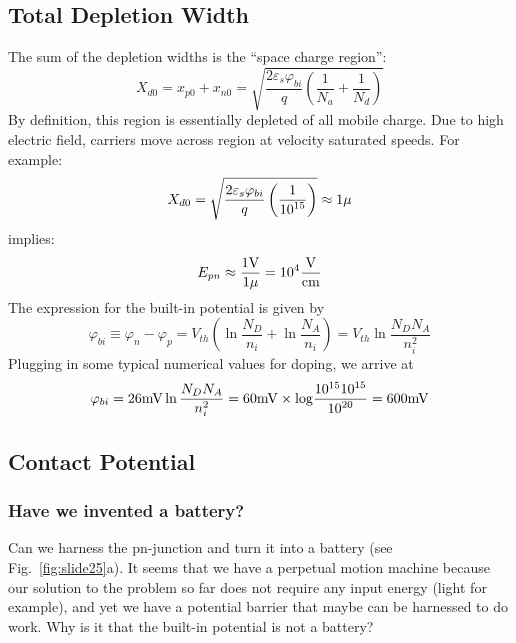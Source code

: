  

\subsection{Total Depletion Width}

The sum of the depletion widths is the “space charge region”:
%
\begin{equation} 
	{X_{d0}} = {x_{p0}} + {x_{n0}} = \sqrt {\frac{{2{\varepsilon _s}{\varphi _{bi}}}}{q}\left( {\frac{1}{{{N_a}}} + \frac{1}{{{N_d}}}} \right)} 
\end{equation}
% 
By definition, this region is essentially depleted of all mobile charge.   Due to high electric field, carriers move across region at velocity saturated speeds.  For example:
\begin{equation} 
	{X_{d0}} = \sqrt {\frac{{2{\varepsilon _s}{\varphi _{bi}}}}{q}\left( {\frac{1}{{{{10}^{15}}}}} \right)}  \approx 1{\rm{\mu }} 
\end{equation}
%
implies:
%
\begin{equation} 
	{E_{pn}} \approx \frac{{1{\rm{V}}}}{{1{\rm{\mu }}}} = {10^4}\frac{{\rm{V}}}{{{\rm{cm}}}} 
\end{equation}
%
The expression for the built-in potential is given by
%
\begin{equation} 
	{\varphi _{bi}} \equiv {\varphi _n} - {\varphi _p} = {V_{th}}\left( {\ln \frac{{{N_D}}}{{{n_i}}} + \ln \frac{{{N_A}}}{{{n_i}}}} \right) = {V_{th}}\ln \frac{{{N_D}{N_A}}}{{n_i^2}} 
\end{equation}
%
Plugging in some typical numerical values for doping, we arrive at
%
\begin{equation} 
	{\varphi _{bi}} = 26{\rm{mV}}\ln \frac{{{N_D}{N_A}}}{{n_i^2}} = 60{\rm{mV}} \times {\rm{log}}\frac{{{\rm{1}}{{\rm{0}}^{{\rm{15}}}}{{10}^{15}}}}{{{{10}^{20}}}} = 600{\rm{mV}} 
\end{equation}
%


\subsection{Contact Potential}


\subsubsection{Have we invented a battery?}

Can we harness the pn-junction and turn it into a battery (see Fig.~\ref{fig:slide25}a).  It seems that we have a perpetual motion machine because our solution to the problem so far does not require any input energy (light for example), and yet we have a potential barrier that maybe can be harnessed to do work.  Why is it that the built-in potential is not a battery?

